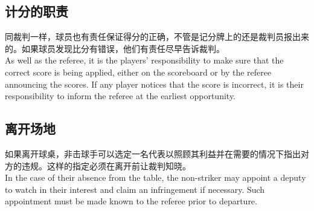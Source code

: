 \subsection{计分的职责}

\noindent 同裁判一样，球员也有责任保证得分的正确，不管是记分牌上的还是裁判员报出来的。如果球员发现比分有错误，他们有责任尽早告诉裁判。\\
As well as the referee, it is the players' responsibility to make sure that the correct score is being applied, either on the scoreboard or by the referee announcing the scores. If any player notices that the score is incorrect, it is their responsibility to inform the referee at the earliest opportunity.

\subsection{离开场地}

\noindent 如果离开球桌，非击球手可以选定一名代表以照顾其利益并在需要的情况下指出对方的违规。这样的指定必须在离开前让裁判知晓。\\
In the case of their absence from the table, the non-striker may appoint a deputy to watch in their interest and claim an infringement if necessary. Such appointment must be made known to the referee prior to departure.
